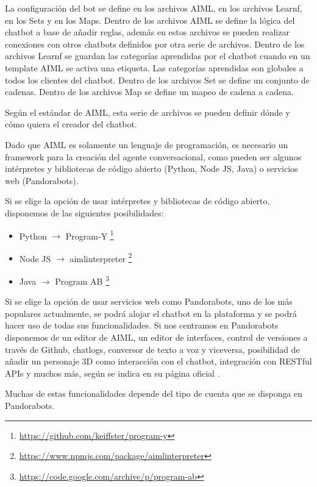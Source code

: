 La configuración del bot se define en los archivos AIML, en los archivos Learnf, en los Sets y en los Maps. Dentro de los archivos AIML se define la lógica del chatbot a base de añadir reglas, además en estos archivos se pueden realizar conexiones con otros chatbots definidos por otra serie de archivos. Dentro de los archivos Learnf se guardan las categorías aprendidas por el chatbot cuando en un template AIML se activa una etiqueta. Las categorías aprendidas son globales a todos los clientes del chatbot. Dentro de los archivos Set se define un conjunto de cadenas. Dentro de los archivos Map se define un mapeo de cadena a cadena.

Según el estándar de AIML, esta serie de archivos se pueden definir dónde y cómo quiera el creador del chatbot.

Dado que AIML es solamente un lenguaje de programación, es necesario un \gls{framework} para la creación del agente conversacional, como pueden ser algunos intérpretes y bibliotecas de código abierto (Python, Node JS, Java) o servicios web (Pandorabots).

Si se elige la opción de usar intérpretes y bibliotecas de código abierto, disponemos de las siguientes posibilidades:

\begin{itemize}
\item Python $\rightarrow$ Program-Y \footnote{\url{https://github.com/keiffster/program-y}}
\item Node JS $\rightarrow$ aimlinterpreter
\footnote{\url{https://www.npmjs.com/package/aimlinterpreter}}
\item Java $\rightarrow$ Program AB \footnote{\url{https://code.google.com/archive/p/program-ab}}
\end{itemize}

Si se elige la opción de usar servicios web como Pandorabots, uno de los más populares actualmente, se podrá alojar el chatbot en la plataforma y se podrá hacer uso de todas sus funcionalidades. Si nos centramos en Pandorabots disponemos de un editor de AIML, un editor de interfaces, control de versiones a través de Github, chatlogs, conversor de texto a voz y viceversa, posibilidad de añadir un personaje 3D como interacción con el chatbot, integración con RESTful \glspl{API} y muchos más, según se indica en su página oficial \cite{RefWorks:RefID:14-pandorabots:}.

Muchas de estas funcionalidades depende del tipo de cuenta que se disponga en Pandorabots.

